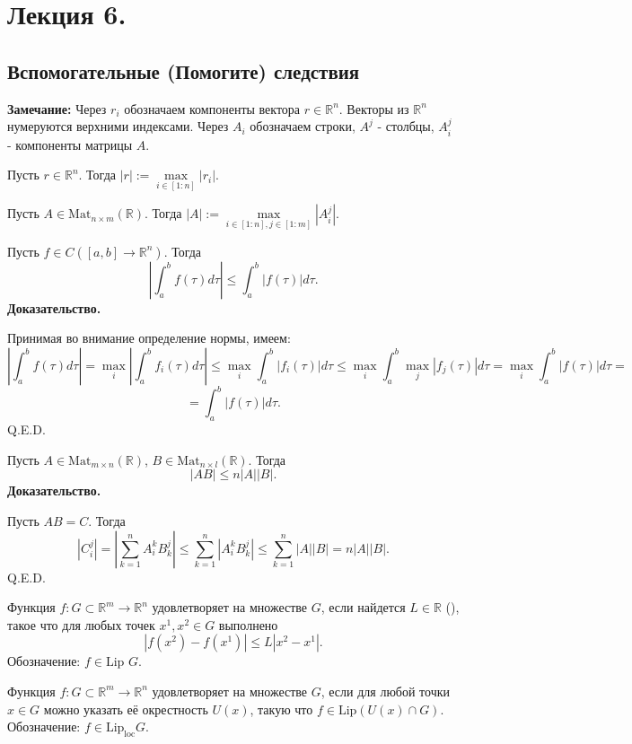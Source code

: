 \section{Лекция 6.}
\subsection{Вспомогательные (Помогите) следствия}

\textbf{Замечание:} Через $r_i$ обозначаем компоненты вектора $r \in \mathbb{R}^n.$ Векторы из $\mathbb{R}^n$ нумеруются верхними индексами. Через $A_i$ обозначаем строки, $A^j$ - столбцы, $A^j_i$ - компоненты матрицы $A.$

 Пусть $r \in \mathbb{R}^n$. Тогда $|r| := \max\limits_{i \in [1:n]} |r_i|$.

 Пусть $A \in \text{Mat}_{n \times m}(\mathbb{R})$. Тогда $|A| := \max\limits_{i \in [1:n], j \in [1:m]} |A^j_i|$.


Пусть $f \in C([a, b] \rightarrow \mathbb{R}^n)$. Тогда
$$\left| \int_a^b f(\tau) d\tau \right| \leq \int_a^b |f(\tau)| d\tau.$$
\textbf{Доказательство.} 

Принимая во внимание определение нормы, имеем:
$$\left| \int_a^b f(\tau) d\tau \right| = \max_i \left| \int_a^b f_i(\tau) d\tau \right| \leq \max_i \int_a^b |f_i(\tau)| d\tau \leq \max_i \int_a^b \max_j |f_j(\tau)| d\tau = \max_i \int_a^b |f(\tau)| d\tau =$$
$$ = \int_a^b |f(\tau)| d\tau.$$
\hfill Q.E.D.


Пусть $A \in \text{Mat}_{m \times n}(\mathbb{R})$, $B \in \text{Mat}_{n \times l}(\mathbb{R})$. Тогда
$$|AB| \leq n |A||B|.$$
\textbf{Доказательство.} 

Пусть $AB = C$. Тогда
$$|C_i^j| = \left| \sum_{k=1}^n A_i^k B_k^j \right| \leq \sum_{k=1}^n \left| A_i^k B_k^j \right| \leq \sum_{k=1}^n |A||B| = n |A||B|.$$
\hfill Q.E.D.

 Функция $f: G \subset \mathbb{R}^m \rightarrow \mathbb{R}^n$ удовлетворяет  на множестве $G$, если найдется $L \in \mathbb{R}$ (), такое что для любых точек $x^1, x^2 \in G$ выполнено
$$|f(x^2) - f(x^1)| \leq L |x^2 - x^1|.$$
Обозначение: $f \in \text{Lip } G$.

 Функция $f: G \subset \mathbb{R}^m \rightarrow \mathbb{R}^n$ удовлетворяет  на множестве $G$, если для любой точки $x \in G$ можно указать её окрестность $U(x)$, такую что $f \in \text{Lip}(U(x) \cap G)$. Обозначение: $f \in \text{Lip}_{\text{loc}} G$.


